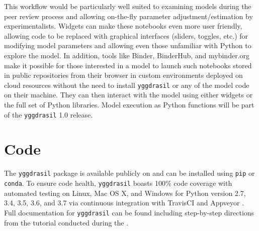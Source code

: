 \documentclass[journal]{IEEEtran}
\newcommand{\todo}[1]{{\color{red}{#1}}}
\newcommand{\pkg}{{\tt yggdrasil}{}}
\newcommand{\hrefgit}[1]{\href{https://github.com/cropsinsilico/cis_interface}{\todo{#1}}}
\newcommand{\hrefdoc}[1]{\href{https://cropsinsilico.github.io/cis_interface/}{\todo{#1}}}
\newcommand{\hrefhack}[1]{\href{https://cropsinsilico.github.io/cis_interface/hackathon2018/index.html}{\todo{#1}}}
\begin{document}
This workflow would be particularly well suited to examining models during the peer review process and allowing on-the-fly parameter adjustment/estimation by experimentalists. Widgets can make these notebooks even more user friendly, allowing code to be replaced with graphical interfaces (sliders, toggles, etc.) for modifying model parameters and allowing even those unfamiliar with Python to explore the model. In addition, tools like Binder, BinderHub, and mybinder.org \citep{Jupyter2018} make it possible for those interested in a model to launch such notebooks stored in public repositories from their browser in custom environments deployed on cloud resources without the need to install {\pkg} or any of the model code on their machine. They can then interact with the model using either widgets or the full set of Python libraries.
%
Model execution as Python functions will be part of the {\pkg} 1.0 release.

\section*{Code}\label{S:code}
The {\pkg} package is available publicly on \hrefgit{Github} and can be 
installed using {\tt pip} or {\tt conda}. To ensure code health, {\pkg} boasts 100\% code coverage with automated testing on Linux, Mac OS X, and Windows for Python version 2.7, 3.4, 3.5, 3.6, and 3.7 via continuous integration with TravisCI \citep{travisci} and Appveyor \citep{appveyor}. Full documentation for {\pkg} can be found \hrefdoc{here} including step-by-step directions from the tutorial conducted during the \hrefhack{2018 Crops in Silico Hackathon}. 


\end{document}
